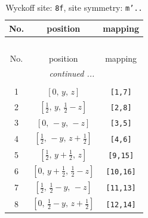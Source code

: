 \documentclass[fleqn,8pt]{jsarticle}
\begin{document}
\begin{longtable}{ccc}
\caption{Wyckoff site: {\tt 8f}, site symmetry: {\tt m'..}}
 \\
 \hline \hline
No. & position & mapping \\ \hline \endfirsthead

\multicolumn{2}{l}{\tablename\ \thetable{}} \\
 \hline \hline
No. & position & mapping \\ \hline \endhead

 \hline \hline
\multicolumn{2}{r}{\footnotesize\it continued ...} \\ \endfoot

 \hline \hline
\multicolumn{2}{r}{} \\ \endlastfoot

1 & $\left[ 0,\, y,\, z \right]$ & {\tt [1,7]} \\ \hline
2 & $\left[ \frac{1}{2},\, y,\, \frac{1}{2} - z \right]$ & {\tt [2,8]} \\ \hline
3 & $\left[ 0,\, - y,\, - z \right]$ & {\tt [3,5]} \\ \hline
4 & $\left[ \frac{1}{2},\, - y,\, z + \frac{1}{2} \right]$ & {\tt [4,6]} \\ \hline
5 & $\left[ \frac{1}{2},\, y + \frac{1}{2},\, z \right]$ & {\tt [9,15]} \\ \hline
6 & $\left[ 0,\, y + \frac{1}{2},\, \frac{1}{2} - z \right]$ & {\tt [10,16]} \\ \hline
7 & $\left[ \frac{1}{2},\, \frac{1}{2} - y,\, - z \right]$ & {\tt [11,13]} \\ \hline
8 & $\left[ 0,\, \frac{1}{2} - y,\, z + \frac{1}{2} \right]$ & {\tt [12,14]} \\
\end{longtable}
\renewcommand{\arraystretch}{1.2}
\end{document}
